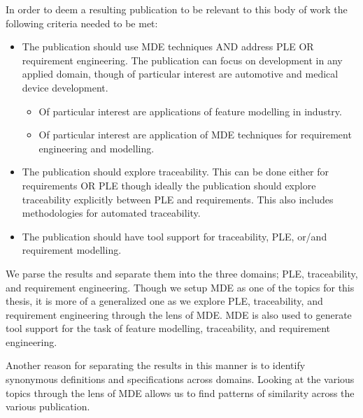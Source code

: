 In order to deem a resulting publication to be relevant to this body of work the following criteria needed to be met:
\begin{itemize}
	\item The publication should use \ac{MDE} techniques AND address \ac{PLE} OR requirement engineering. The publication can focus on development in any applied domain, though of particular interest are automotive and medical device development. 
	\begin{itemize}
		\item Of particular interest are applications of feature modelling in industry. 
		\item Of particular interest are application of \ac{MDE} techniques for requirement engineering and modelling.
	\end{itemize}
	\item The publication should explore traceability. This can be done either for requirements OR \ac{PLE} though ideally the publication should explore traceability explicitly between \ac{PLE} and requirements. This also includes methodologies for automated traceability.
	\item The publication should have tool support for traceability, \ac{PLE}, or/and requirement modelling. 
\end{itemize}

We parse the results and separate them into the three domains; \ac{PLE}, traceability, and requirement engineering. Though we setup \ac{MDE} as one of the topics for this thesis, it is more of a generalized one as we explore \ac{PLE}, traceability, and requirement engineering through the lens of \ac{MDE}. \ac{MDE} is also used to generate tool support for the task of feature modelling, traceability, and requirement engineering.

Another reason for separating the results in this manner is to identify synonymous definitions and specifications across domains. Looking at the various topics through the lens of \ac{MDE} allows us to find patterns of similarity across the various publication. 



